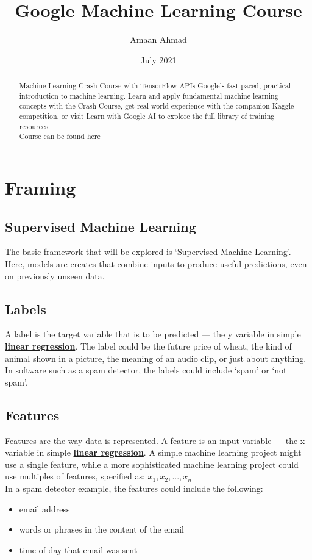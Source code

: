 \documentclass[12pt]{article}
\title{\textbf{\Huge Google Machine Learning Course}}
\date{\large July 2021}
\author{\Large Amaan Ahmad}
\begin{document}
\maketitle
\begin{abstract}
\begin{center}
	Machine Learning Crash Course with TensorFlow APIs Google's fast-paced, practical introduction to machine learning. Learn and apply fundamental machine learning concepts with the Crash Course, get real-world experience with the companion Kaggle competition, or visit Learn with Google AI to explore the full library of training resources.\\
	Course can be found \href{https://developers.google.com/machine-learning/crash-course}{here}
\end{center}

\end{abstract}
\newpage
\tableofcontents
\newpage
\section{Framing}
\subsection{Supervised Machine Learning}
The basic framework that will be explored is `Supervised Machine Learning'. Here, models are creates that combine inputs to produce useful predictions, even on previously unseen data.
\subsection{Labels}
A label is the target variable that is to be predicted — the y variable in simple \href{https://developers.google.com/machine-learning/glossary#linear_regression}{\textbf{linear regression}}. The label could be the future price of wheat, the kind of animal shown in a picture, the meaning of an audio clip, or just about anything.
\\ \newline In software such as a spam detector, the labels could include `spam' or `not spam'.
\subsection{Features}
Features are the way data is represented. A feature is an input variable — the x variable in simple \href{https://developers.google.com/machine-learning/glossary#linear_regression}{\textbf{linear regression}}. A simple machine learning project might use a single feature, while a more sophisticated machine learning project could use multiples of features, specified as: $x_1, x_2,...,x_n$
\\ \newline In a spam detector example, the features could include the following:
	\begin{itemize}
		\item email address
		\item words or phrases in the content of the email
		\item time of day that email was sent
	\end{itemize}
\end{document}
